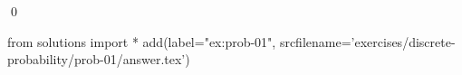 
\begin{ex} 
  \label{ex:prob-01}
  
  \qed
\end{ex} 
\begin{python0}
from solutions import *
add(label="ex:prob-01",
    srcfilename='exercises/discrete-probability/prob-01/answer.tex') 
\end{python0}
